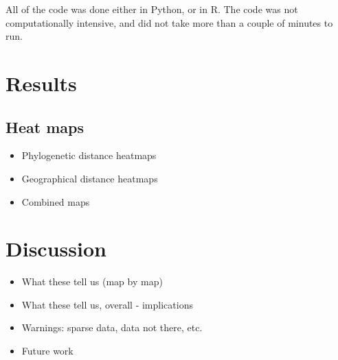 \documentclass[11pt]{article}
\begin{document}


All of the code was done either in Python, or in R. %
The code was not computationally intensive, and did not take more than a couple of minutes to run.






\section{Results} %
\subsection{Heat maps}
\begin{itemize}
\item Phylogenetic distance heatmaps
\item Geographical distance heatmaps
\item Combined maps
\end{itemize}


\section{Discussion}
\begin{itemize}
\item What these tell us (map by map)
\item What these tell us, overall - implications
\item Warnings: sparse data, data not there, etc. 
\item Future work 
%
\end{itemize}



\end{document}
